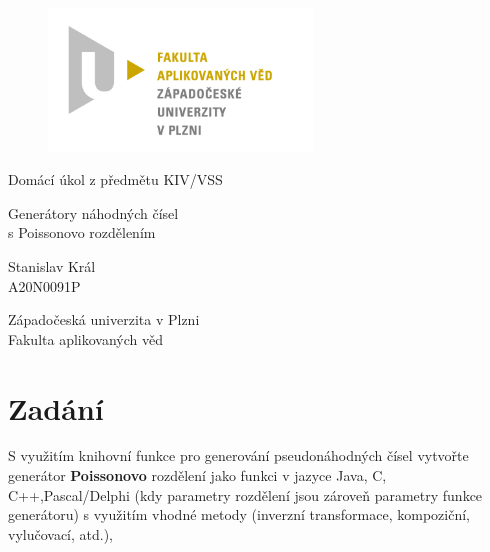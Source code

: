 \documentclass[12pt, a4paper]{article}
\let\oldsection\section
\renewcommand\section{\clearpage\oldsection}
\begin{document}
	\renewcommand{\lstlistingname}{Ukázka kódu}
	\renewcommand{\lstlistlistingname}{Seznam ukázek kódu}
    \begin{titlepage}

        \centering

        \vspace*{\baselineskip}
        \begin{figure}[H]
        \centering
        \includegraphics[width=7cm]{img/fav-logo.jpg}
        \end{figure}

        \vspace*{1\baselineskip}

        \vspace{0.75\baselineskip}

        \vspace{0.5\baselineskip}
        {Domácí úkol z předmětu KIV/VSS}

        {\LARGE\sc Generátory náhodných čísel\\}
        {\sc s Poissonovo rozdělením\\}

        \vspace{4\baselineskip}

        \vspace{0.5\baselineskip}

        {\sc\Large Stanislav Král \\}
        \vspace{0.5\baselineskip}
        {A20N0091P}

        \vfill

        {\sc Západočeská univerzita v Plzni\\
        Fakulta aplikovaných věd}

    \end{titlepage}

    \tableofcontents
    \pagebreak

\section{Zadání}
S využitím knihovní funkce pro generování pseudonáhodných čísel vytvořte generátor \textbf{Poissonovo} rozdělení jako funkci v jazyce Java, C, C++,Pascal/Delphi (kdy parametry rozdělení jsou zároveň parametry funkce generátoru) s využitím vhodné metody (inverzní transformace, kompoziční, vylučovací, atd.),
\end{document}
